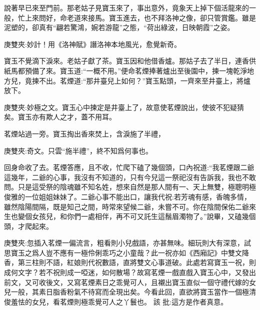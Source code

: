 \begin{parag}
    說著早已來至門前。那老姑子見寶玉來了，事出意外，竟象天上掉下個活龍來的一般，忙上來問好，命老道來接馬。寶玉進去，也不拜洛神之像，卻只管賞鑑。雖是泥塑的，卻真有“翩若驚鴻，婉若游龍”之態，“荷出綠波，日映朝霞”之姿。\begin{note}庚雙夾:妙計！用《洛神賦》譖洛神本地風光，愈覺新奇。\end{note}寶玉不覺滴下淚來。老姑子獻了茶。寶玉因和他借香爐。那姑子去了半日，連香供紙馬都預備了來。寶玉道:“一概不用。”便命茗煙捧著爐出至後園中，揀一塊乾淨地方兒，竟揀不出。茗煙道:“那井臺兒上如何？”寶玉點頭，一齊來至井臺上，將爐放下。\begin{note}庚雙夾:妙極之文。寶玉心中揀定是井臺上了，故意使茗煙說出，使彼不犯疑猜矣。寶玉亦有欺人之才，蓋不用耳。\end{note}
\end{parag}


\begin{parag}
    茗煙站過一旁。寶玉掏出香來焚上，含淚施了半禮，\begin{note}庚雙夾:奇文。只雲“施半禮”，終不知爲何事也。\end{note}回身命收了去。茗煙答應，且不收，忙爬下磕了幾個頭，口內祝道:“我茗煙跟二爺這幾年，二爺的心事，我沒有不知道的，只有今兒這一祭祀沒有告訴我，我也不敢問。只是這受祭的陰魂雖不知名姓，想來自然是那人間有一、天上無雙，極聰明極俊雅的一位姐姐妹妹了。二爺心事不能出口，讓我代祝:若芳魂有感，香魄多情，雖然陰陽間隔，既是知己之間，時常來望候二爺，未嘗不可。你在陰間保佑二爺來生也變個女孩兒，和你們一處相伴，再不可又託生這鬚眉濁物了。”說畢，又磕幾個頭，才爬起來。\begin{note}庚雙夾:忽插入茗煙一偏流言，粗看則小兒戲語，亦甚無味。細玩則大有深意，試思寶玉之爲人豈不應有一極伶俐乖巧之小童哉？此一祝亦如《西廂記》中雙文降香，第三柱則不語，紅娘則代祝數語，直將雙文心事道破。此處若寫寶玉一祝，則成何文字？若不祝則成一啞迷，如何散場？故寫茗煙一戲直戲入寶玉心中，又發出前文，又可收後文，又寫茗煙素日之乖覺可人，且襯出寶玉直似一個守禮代嫁的女兒一般，其素日脂香粉氣不待寫而全現出矣。今看此回，直欲將寶玉當作一個極清俊羞怯的女兒，看茗煙則極乖覺可人之丫鬟也。 該 批:這方是作者真意。\end{note}
\end{parag}


